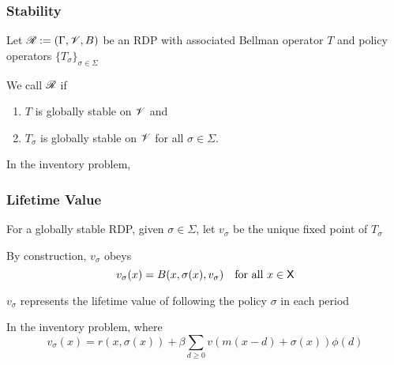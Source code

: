 \begin{frame}
    \frametitle{Stability}
    
    Let $\mathscr R := (\Gamma, \mathscr V, B)$ be an RDP with associated Bellman
    operator $T$ and policy operators $\{T_\sigma\}_{\sigma \in \Sigma}$

        \vspace{0.5em}
    We call $\mathscr R$  if
    \begin{enumerate}
        \item $T$ is globally stable on $\mathscr V$ and
        \vspace{0.5em}
        \item $T_\sigma$ is globally stable on $\mathscr V$ for all $\sigma \in \Sigma$.
    \end{enumerate}

    \Eg In the inventory problem,

\end{frame}


\begin{frame}
    \frametitle{Lifetime Value}

    For a globally stable RDP, given $\sigma \in \Sigma$, let
    $v_\sigma$ be the unique fixed point of $T_\sigma$ 

    By construction, $v_\sigma$ obeys
    \begin{equation*}
        v_\sigma(x) = B(x, \sigma(x), v_\sigma)
        \quad \text{for all } x \in \mathsf X
    \end{equation*}
%


     $v_\sigma$ represents the lifetime value of following the
    policy $\sigma$ in each period 

    \Eg In the inventory problem, where
    \begin{equation*}
        v_\sigma(x)
        = r(x, \sigma(x))
                + \beta
                \sum_{d \geq 0} v(m(x - d) + \sigma(x)) \phi(d)
    \end{equation*}

\end{frame}


\begin{frame}
    

\end{frame}











